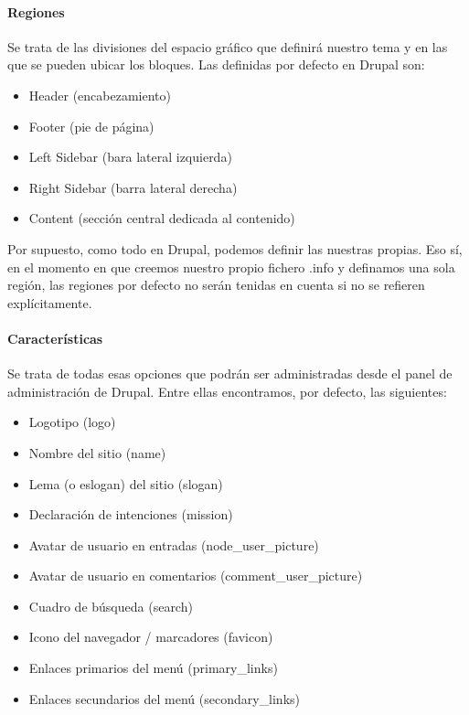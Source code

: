 \paragraph{Regiones}
\par Se trata de las divisiones del espacio gráfico que definirá nuestro tema y en las que se pueden ubicar los bloques. Las definidas por defecto en Drupal son:
\begin{itemize}
\item Header (encabezamiento)
\item Footer (pie de página)
\item Left Sidebar (bara lateral izquierda)
\item Right Sidebar (barra lateral derecha)
\item Content (sección central dedicada al contenido)
\end{itemize}

\par Por supuesto, como todo en Drupal, podemos definir las nuestras propias. Eso sí, en el momento en que creemos nuestro propio fichero .info y definamos una sola región, las regiones por defecto no serán tenidas en cuenta si no se refieren explícitamente.

\paragraph{Características}
\par Se trata de todas esas opciones que podrán ser administradas desde el panel de administración de Drupal. Entre ellas encontramos, por defecto, las siguientes:

\begin{itemize}
\item Logotipo (logo)
\item Nombre del sitio (name)
\item Lema (o eslogan) del sitio (slogan)
\item Declaración de intenciones (mission)
\item Avatar de usuario en entradas (node_user_picture)
\item Avatar de usuario en comentarios (comment_user_picture)
\item Cuadro de búsqueda (search)
\item Icono del navegador / marcadores (favicon)
\item Enlaces primarios del menú (primary_links)
\item Enlaces secundarios del menú (secondary_links)
\end{itemize}

